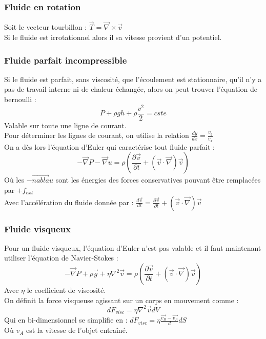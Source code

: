\documentclass[../main.tex]{subfiles}
\begin{document}
\subsubsection{Fluide en rotation}
Soit le vecteur tourbillon : $\vec{T} = \vec{\nabla} \times \vec{v}$\\
Si le fluide est irrotationnel alors il sa vitesse provient d'un potentiel.\\

\subsubsection{Fluide parfait incompressible}
Si le fluide est parfait, sans viscosité, que l'écoulement est stationnaire, qu'il n'y a pas de travail interne ni de chaleur échangée, alors on peut trouver l'équation de bernoulli :\\
\begin{equation}
    P + \rho gh + \rho \frac{v^2}{2} = cste
\end{equation}
Valable sur toute une ligne de courant.\\

Pour déterminer les lignes de courant, on utilise la relation $\frac{dy}{dx} = \frac{v_y}{v_x}$\\

On a dès lors l'équation d'Euler qui caractérise tout fluide parfait : \\
\begin{equation}
    -\vec{\nabla}P - \vec{\nabla}u = \rho(\frac{\partial \vec{v}}{\partial t} + (\vec{v} \cdot \vec{\nabla})\vec{v})
\end{equation}
Où les $-\vec{nabla}u$ sont les énergies des forces conservatives pouvant être remplacées par $+f_{ext}$\\
Avec l'accélération du fluide donnée par : $\frac{d\vec{v}}{dt} = \frac{\partial \vec{v}}{\partial t} + (\vec{v} \cdot \vec{\nabla})\vec{v}$

\subsubsection{Fluide visqueux}
Pour un fluide visqueux, l'équation d'Euler n'est pas valable et il faut maintenant utiliser l'équation de Navier-Stokes : \\
\begin{equation}
    -\vec{\nabla}P +\rho\vec{g} + \eta \nabla^2\vec{v}  = \rho(\frac{\partial \vec{v}}{\partial t} + (\vec{v} \cdot \vec{\nabla})\vec{v})
\end{equation}
Avec $\eta$ le coefficient de viscosité.\\
On définit la force visqueuse agissant sur un corps en mouvement comme : \\
\begin{equation}
    dF_{visc} = \eta \nabla^2\vec{v}dV
\end{equation}
Qui en bi-dimensionnel se simplifie en : $dF_{visc} = \eta \frac{\vec{v_B}-\vec{v_A}}{d}dS$\\ Où $v_A$ est la vitesse de l'objet entraîné.\\
\end{document}
